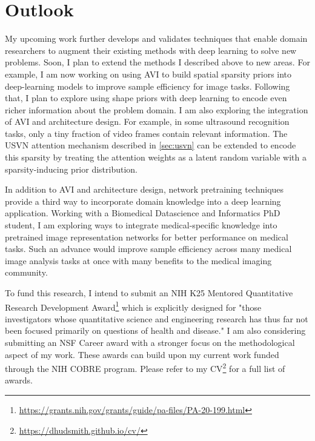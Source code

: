 \documentclass{tufte-handout}
\begin{document}
\section{Outlook}
My upcoming work further develops and validates techniques that enable domain researchers to augment their existing methods with deep learning to solve new problems. Soon, I plan to extend the methods I described above to new areas. For example, I am now working on using AVI to build spatial sparsity priors into deep-learning models to improve sample efficiency for image tasks. Following that, I plan to explore using shape priors with deep learning to encode even richer information about the problem domain. I am also exploring the integration of AVI and architecture design. For example, in some ultrasound recognition tasks, only a tiny fraction of video frames contain relevant information. The USVN attention mechanism described in \ref{sec:usvn} can be extended to encode this sparsity by treating the attention weights as a latent random variable with a sparsity-inducing prior distribution.

In addition to AVI and architecture design, network pretraining techniques provide a third way to incorporate domain knowledge into a deep learning application. Working with a Biomedical Datascience and Informatics PhD student, I am exploring ways to integrate medical-specific knowledge into pretrained image representation networks for better performance on medical tasks. Such an advance would improve sample efficiency across many medical image analysis tasks at once with many benefits to the medical imaging community.

To fund this research, I intend to submit an NIH K25 Mentored Quantitative Research Development Award\thanks{\url{https://grants.nih.gov/grants/guide/pa-files/PA-20-199.html}} which is explicitly designed for "those investigators whose quantitative science and engineering research has thus far not been focused primarily on questions of health and disease." I am also considering submitting an NSF Career award with a stronger focus on the methodological aspect of my work. These awards can build upon my current work funded through the NIH COBRE program. Please refer to my CV\thanks{\url{https://dhudsmith.github.io/cv/}} for a full list of awards.




\end{document}
